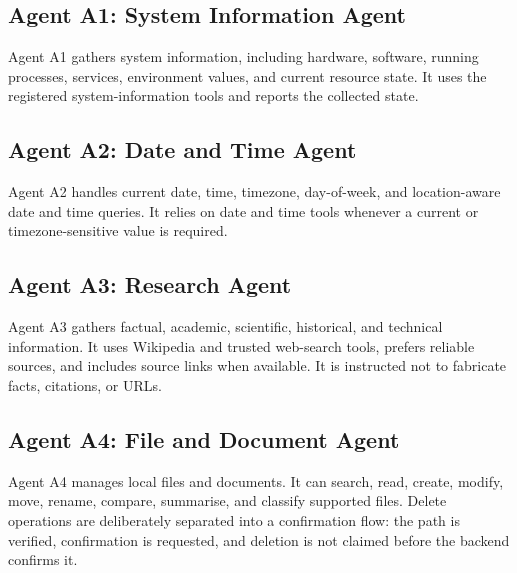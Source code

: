\subsection{Agent A1: System Information Agent}
Agent A1 gathers system information, including hardware, software, running
processes, services, environment values, and current resource state. It uses
the registered system-information tools and reports the collected state.

\subsection{Agent A2: Date and Time Agent}
Agent A2 handles current date, time, timezone, day-of-week, and location-aware
date and time queries. It relies on date and time tools whenever a current or
timezone-sensitive value is required.

\subsection{Agent A3: Research Agent}
Agent A3 gathers factual, academic, scientific, historical, and technical
information. It uses Wikipedia and trusted web-search tools, prefers reliable
sources, and includes source links when available. It is instructed not to
fabricate facts, citations, or URLs.

\subsection{Agent A4: File and Document Agent}
Agent A4 manages local files and documents. It can search, read, create,
modify, move, rename, compare, summarise, and classify supported files. Delete
operations are deliberately separated into a confirmation flow: the path is
verified, confirmation is requested, and deletion is not claimed before the
backend confirms it.

